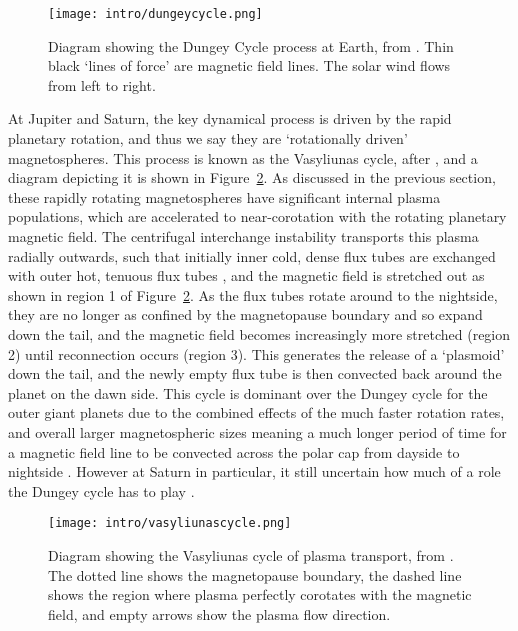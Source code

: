 {\begin{figure}
\centering
\noindent\texttt{[image: intro/dungeycycle.png]}
\caption[Diagram of the Dungey cycle.]{Diagram showing the Dungey Cycle process at Earth, from \citet{dungey1961}. Thin black `lines of force' are magnetic field lines. The solar wind flows from left to right.}
\label{intro:fig:dungeycycle}
\end{figure}

At Jupiter and Saturn, the key dynamical process is driven by the rapid planetary rotation, and thus we say they are `rotationally driven' magnetospheres. This process is known as the Vasyliunas cycle, after \citet{vasyliunas1983}, and a diagram depicting it is shown in Figure~\ref{intro:fig:vasyliunascycle}. As discussed in the previous section, these rapidly rotating magnetospheres have significant internal plasma populations, which are accelerated to near-corotation with the rotating planetary magnetic field. The centrifugal interchange instability transports this plasma radially outwards, such that initially inner cold, dense flux tubes are exchanged with outer hot, tenuous flux tubes \citep{southwood1989}, and the magnetic field is stretched out as shown in region 1 of Figure~\ref{intro:fig:vasyliunascycle}. As the flux tubes rotate around to the nightside, they are no longer as confined by the magnetopause boundary and so expand down the tail, and the magnetic field becomes increasingly more stretched (region 2) until reconnection occurs (region 3). This generates the release of a `plasmoid' down the tail, and the newly empty flux tube is then convected back around the planet on the dawn side. This cycle is dominant over the Dungey cycle for the outer giant planets due to the combined effects of the much faster rotation rates, and overall larger magnetospheric sizes meaning a much longer period of time for a magnetic field line to be convected across the polar cap from dayside to nightside \citep{forsyth2010}. However at Saturn in particular, it still uncertain how much of a role the Dungey cycle has to play \citep[e.g.][]{cowley2005}.

\begin{figure}
\centering
\noindent\texttt{[image: intro/vasyliunascycle.png]}
\caption[Diagram of the Vasyliunas cycle.]{Diagram showing the Vasyliunas cycle of plasma transport, from \citet{vasyliunas1983}. The dotted line shows the magnetopause boundary, the dashed line shows the region where plasma perfectly corotates with the magnetic field, and empty arrows show the plasma flow direction.}
\label{intro:fig:vasyliunascycle}
\end{figure}

}
